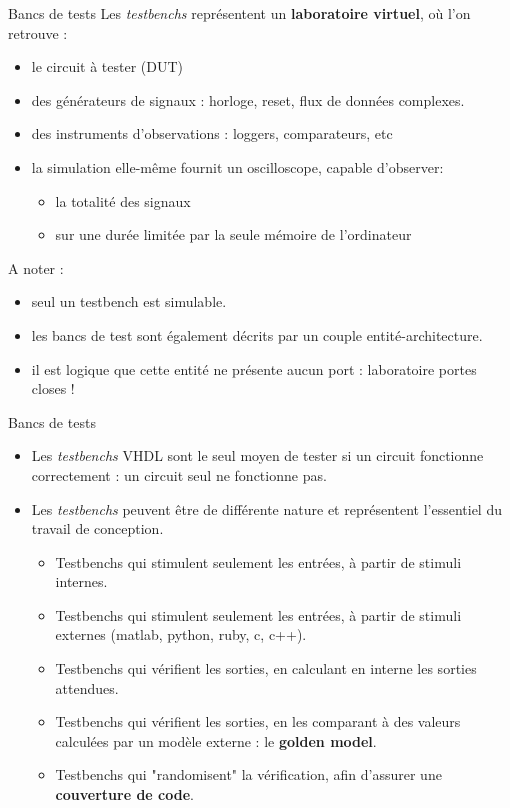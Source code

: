 \documentclass[xcolor=table]{beamer} %
\begin{document}
\begin{frame}{Bancs de tests}
  Les {\it testbenchs} représentent un \textbf{laboratoire virtuel}, où l'on retrouve :
  \begin{itemize}
    \item le circuit à tester (DUT)
    \item des générateurs de signaux : horloge, reset, flux de données complexes.
    \item des instruments d'observations : loggers, comparateurs, etc
    \item la simulation elle-même fournit un oscilloscope, capable d'observer:
    \begin{itemize}
      \item la totalité des signaux
      \item sur une durée limitée par la seule mémoire de l'ordinateur
    \end{itemize}
  \end{itemize}

  A noter :
  \begin{itemize}
    \item seul un testbench est simulable.
    \item les bancs de test sont également décrits par un couple entité-architecture.
    \item il est logique que cette entité ne présente aucun port : laboratoire portes closes !
  \end{itemize}

\end{frame}

\begin{frame}{Bancs de tests}
  \begin{itemize}
    \item Les {\it testbenchs} VHDL sont le seul moyen de tester si un circuit fonctionne correctement : un circuit seul ne fonctionne pas.
    \item Les {\it testbenchs} peuvent être de différente nature et représentent l'essentiel du travail de conception.
    \begin{itemize}
      \item Testbenchs qui stimulent seulement les entrées, à partir de stimuli internes.
      \item Testbenchs qui stimulent seulement les entrées, à partir de stimuli externes (matlab, python, ruby, c, c++).
      \item Testbenchs qui vérifient les sorties, en calculant en interne les sorties attendues.
      \item Testbenchs qui vérifient les sorties, en les comparant à des valeurs calculées par un modèle externe : le \textbf{golden model}.
      \item Testbenchs qui "randomisent" la vérification, afin d'assurer une \textbf{couverture de code}.
    \end{itemize}

  \end{itemize}
\end{frame}
\end{document}
